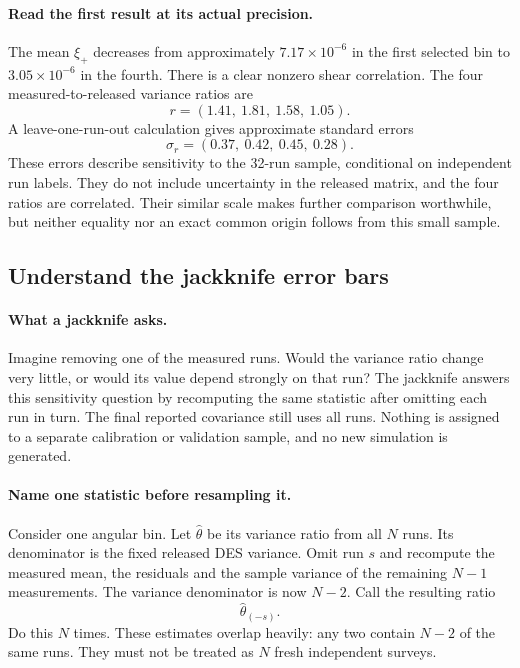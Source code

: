 \documentclass[11pt]{article}
\begin{document}
\paragraph{Read the first result at its actual precision.}
The mean $\xi_+$ decreases from approximately $7.17\times10^{-6}$ in the
first selected bin to $3.05\times10^{-6}$ in the fourth. There is a clear
nonzero shear correlation. The four measured-to-released variance ratios are
\begin{equation}
 r=(1.41,\ 1.81,\ 1.58,\ 1.05).
\end{equation}
A leave-one-run-out calculation gives approximate standard errors
\begin{equation}
 \sigma_{r}=(0.37,\ 0.42,\ 0.45,\ 0.28).
\end{equation}
These errors describe sensitivity to the 32-run sample, conditional on
independent run labels. They do not include uncertainty in the released
matrix, and the four ratios are correlated. Their similar scale makes
further comparison worthwhile, but neither equality nor an exact common
origin follows from this small sample.

\subsection{Understand the jackknife error bars}
\label{sec:jackknife}
\paragraph{What a jackknife asks.}
Imagine removing one of the measured runs. Would the variance ratio change
very little, or would its value depend strongly on that run? The jackknife
answers this sensitivity question by recomputing the same statistic after
omitting each run in turn. The final reported covariance still uses all
runs. Nothing is assigned to a separate calibration or validation sample,
and no new simulation is generated.

\paragraph{Name one statistic before resampling it.}
Consider one angular bin. Let $\widehat\theta$ be its variance ratio from
all $N$ runs. Its denominator is the fixed released DES variance. Omit run
$s$ and recompute the measured mean, the residuals and the sample variance
of the remaining $N-1$ measurements. The variance denominator is now $N-2$.
Call the resulting ratio
\begin{equation}
 \widehat\theta_{(-s)}.
\end{equation}
Do this $N$ times. These estimates overlap heavily: any two contain $N-2$
of the same runs. They must not be treated as $N$ fresh independent surveys.
\end{document}
